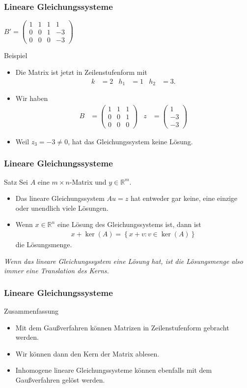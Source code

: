 \documentclass{beamer}
\renewcommand{\emph}[1]{{\textcolor{solarizedRed}{\itshape #1}}}
\newcommand\RR{\mathbb R}
\newcommand\bc[1]{\left({#1}\right)}
\newcommand\cbc[1]{\left\{{#1}\right\}}
\renewcommand{\oe}{\"o}
\newcommand{\mytitle}{Lineare Gleichungssysteme}
\begin{document}
\begin{frame}\frametitle{\mytitle}
	\hfill$B'=\bc{\begin{array}{ccc|c} 1&1&1&1\\0&0&1&-3\\0&0&0&-3\end{array}}$
	\begin{block}{Beispiel}
		\begin{itemize}
			\item Die Matrix ist jetzt in Zeilenstufenform mit
				\begin{align*}
					k&=2&h_1&=1&h_2&=3.
				\end{align*}
			\item Wir haben
				\begin{align*}
					B&=\begin{pmatrix}1&1&1\\0&0&1\\0&0&0\end{pmatrix}&
					z&=\begin{pmatrix} 1\\-3\\-3 \end{pmatrix}
				\end{align*}
			\item Weil $z_3=-3\neq0$, hat das Gleichungssystem keine L\oe sung. 
		\end{itemize}
	\end{block}
\end{frame}

\begin{frame}\frametitle{\mytitle}
	\begin{block}{Satz}
		Sei $A$ eine $m\times n$-Matrix und $y\in\RR^m$.
		\begin{itemize}
			\item Das lineare Gleichungssystem $Au=z$ hat entweder gar keine, eine einzige oder unendlich viele L\oe sungen.
			\item Wenn $x\in\RR^n$ eine L\oe sung des Gleichungssystems ist, dann ist
				\begin{align*}
					x+\ker(A)=\cbc{x+v:v\in\ker(A)}
				\end{align*}
				die L\oe sungsmenge.
		\end{itemize}
	\end{block}
	\emph{Wenn das lineare Gleichungssystem eine L\oe sung hat, ist die L\oe sungsmenge also immer eine Translation des Kerns.}
\end{frame}

\begin{frame}\frametitle{\mytitle}
	\begin{block}{Zusammenfassung}
	\begin{itemize}
	\item Mit dem Gau\ss verfahren k\oe nnen Matrizen in Zeilenstufenform gebracht werden.
	\item Wir k\oe nnen dann den Kern der Matrix ablesen.
	\item Inhomogene lineare Gleichungssysteme k\oe nnen ebenfalls mit dem Gau\ss verfahren gel\oe st werden.
	\end{itemize}
	\end{block}
\end{frame}
\end{document}
